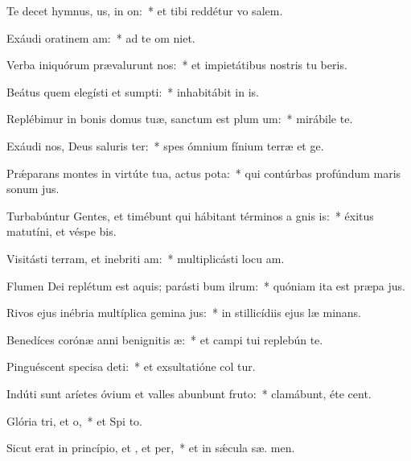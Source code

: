\item Te decet hymnus, us, in on:~* et tibi reddétur vo  salem.
\item Exáudi oratinem am:~* ad te om  niet.
\item Verba iniquórum prævalurunt  nos:~* et impietátibus nostris tu beris.
\item Beátus quem elegísti et sumpti:~* inhabitábit in  is.
\item Replébimur in bonis domus tuæ, sanctum est plum um:~* mirábile  te.
\item Exáudi nos, Deus saluris ter:~* spes ómnium fínium terræ et   ge.
\item Prǽparans montes in virtúte tua, actus pota:~* qui contúrbas profúndum maris sonum  jus.
\item Turbabúntur Gentes, et timébunt qui hábitant términos a gnis is:~* éxitus matutíni, et véspe bis.
\item Visitásti terram, et inebriti am:~* multiplicásti locu am.
\item Flumen Dei replétum est aquis; parásti bum ilrum:~* quóniam ita est præpa jus.
\item Rivos ejus inébria multíplica gemina jus:~* in stillicídiis ejus læ minans.
\item Benedíces corónæ anni benignitis æ:~* et campi tui replebún te.
\item Pinguéscent specisa deti:~* et exsultatióne col tur.
\item Indúti sunt aríetes óvium et valles abunbunt fruto:~* clamábunt, éte  cent.
\item Glória tri, et o,~* et Spi to.
\item Sicut erat in princípio, et , et per,~* et in sǽcula sæ. men.
